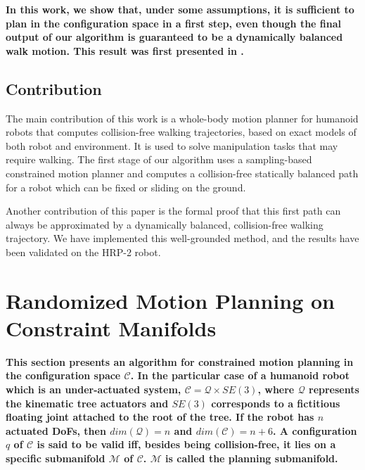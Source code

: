 \documentclass{article}
\newcommand\manifold{\mathcal{M}}
\begin{document}
\textbf{In this work, we show that, under some assumptions, it is
  sufficient to plan in the configuration space in a first step, even
  though the final output of our algorithm is guaranteed to be a
  dynamically balanced walk motion. This result was first presented in
  \cite{dalibard2011small}.}

\subsection{Contribution}

The main contribution of this work is a whole-body motion planner for
humanoid robots that computes collision-free walking trajectories,
based on exact models of both robot and environment. It is used to
solve manipulation tasks that may require walking. The first stage of
our algorithm uses a sampling-based constrained motion planner and
computes a collision-free statically balanced path for a robot which
can be fixed or sliding on the ground.

Another contribution of this paper is the formal proof that this first
path can always be approximated by a dynamically balanced,
collision-free walking trajectory. We have implemented this
well-grounded method, and the results have been validated on the HRP-2
robot.

\section{Randomized Motion Planning on Constraint Manifolds}
\label{sec:wb}

\textbf{This section presents an algorithm for constrained motion
  planning in the configuration space $\mathcal{C}$. In the particular
  case of a humanoid robot which is an under-actuated system,
  $\mathcal{C}=\mathcal{Q} \times SE(3)$, where $\mathcal{Q}$
  represents the kinematic tree actuators and $SE(3)$ corresponds to a
  fictitious floating joint attached to the root of the tree. If the
  robot has $n$ actuated DoFs, then $dim(\mathcal{Q})=n$ and
  $dim(\mathcal{C})=n+6$. A configuration $q$ of $\mathcal{C}$ is said
  to be valid iff, besides being collision-free, it lies on a specific
  submanifold $\manifold$ of $\mathcal{C}$. $\manifold$ is called
  the planning submanifold.}
\end{document}
